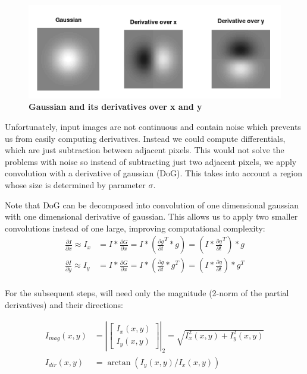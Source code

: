 \documentclass[fleqn,moreauthors,10pt]{ds_report}
\begin{document}
\begin{figure}[h]\centering
	\includegraphics[width=\linewidth]{gaussians.png}
	\caption{\textbf{Gaussian and its derivatives over x and y}}
	\label{fig:gaussians}
\end{figure}

Unfortunately, input images are not continuous and contain noise which prevents us from easily computing derivatives. Instead we could compute differentials, which are just subtraction between adjacent pixels. This would not solve the problems with noise so instead of subtracting just two adjacent pixels, we apply convolution with a derivative of gaussian (DoG). This takes into account a region whose size is determined by parameter $\sigma$.

Note that DoG can be decomposed into convolution of one dimensional gaussian with one dimensional derivative of gaussian. This allows us to apply two smaller convolutions instead of one large, improving computational complexity:
\begin{equation}
	\begin{aligned}
		\frac{\partial I}{\partial x} \approx I_x 
		& = I \ast \frac{\partial G}{\partial x} 
		= I \ast (\frac{\partial g}{\partial t}^T \ast g)
		= (I \ast \frac{\partial g}{\partial t}^T) \ast g\\
		\frac{\partial I}{\partial y} \approx I_y 
		& = I \ast \frac{\partial G}{\partial x} 
		= I \ast (\frac{\partial g}{\partial t} \ast g^T)
		= (I \ast \frac{\partial g}{\partial t}) \ast g^T\\
	\end{aligned}
\end{equation}

For the subsequent steps, will need only the magnitude (2-norm of the partial derivatives) and their directions: 

\begin{equation}
	\begin{aligned}
		I_{mag}(x, y) & = |\begin{bmatrix}I_x(x, y) \\ I_y(x, y)\end{bmatrix}|_2 
			= \sqrt{I_x^2(x, y) + I_y^2(x, y)} \\
		I_{dir}(x, y) & = \arctan(I_y(x, y) / I_x(x, y))
	\end{aligned}
\end{equation}
\end{document}
